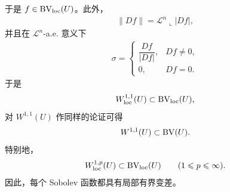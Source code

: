 \documentclass[../../main.tex]{subfiles}%
\begin{document}
\begin{solution}
于是 $f\in\mathrm{BV}_{\mathrm{loc}}(U)$。此外，
\begin{align*}
\lVert Df\rVert=\mathcal{L}^n\llcorner\lvert Df\rvert,
\end{align*}
并且在 $\mathcal{L}^n$-a.e. 意义下
\begin{align*}
\sigma=
\begin{cases}
\dfrac{Df}{\lvert Df\rvert}, & Df\neq0,\\
0, & Df=0 .
\end{cases}
\end{align*}
于是
\begin{align*}
W^{1,1}_{\mathrm{loc}}(U)\subset\mathrm{BV}_{\mathrm{loc}}(U),
\end{align*}
对 $W^{1,1}(U)$ 作同样的论证可得
\begin{align*}
W^{1,1}(U)\subset\mathrm{BV}(U).
\end{align*}
特别地，
\begin{align*}
W^{1,p}_{\mathrm{loc}}(U)\subset\mathrm{BV}_{\mathrm{loc}}(U)\qquad(1\leqslant p\leqslant\infty).
\end{align*}
因此，每个 Sobolev 函数都具有局部有界变差。
\end{solution}
\end{document}
